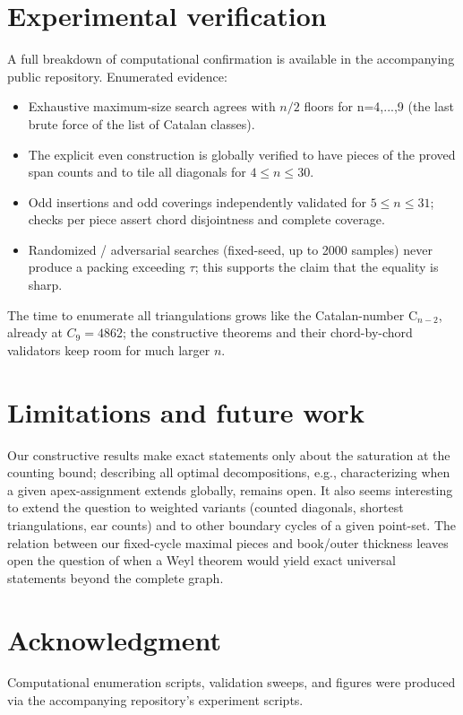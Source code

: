 \documentclass[11pt,a4paper]{article}
\begin{document}
\section{Experimental verification}

A full breakdown of computational confirmation is available in the
accompanying public repository. Enumerated evidence:

\begin{itemize}
\item Exhaustive maximum-size search agrees with $n/2$ floors for
n=4,...,9 (the last brute force of the list of Catalan classes).
\item The explicit even construction is globally verified to have pieces of the
proved span counts and to tile all diagonals for $4 \le n \le 30$.
\item Odd insertions and odd coverings independently validated for
$5 \le n \le 31$; checks per piece assert chord disjointness and complete
coverage.
\item Randomized / adversarial searches (fixed-seed, up to 2000 samples) never
produce a packing exceeding $\tau$; this supports the claim that the
equality is sharp.
\end{itemize}

The time to enumerate all triangulations grows like the Catalan-number
$\mathrm{C}_{n-2}$, already at $C_{9}=4862$; the constructive theorems and
their chord-by-chord validators keep room for much larger $n$.

\section{Limitations and future work}

Our constructive results make exact statements only about the saturation at
the counting bound; describing all optimal decompositions, e.g., characterizing
when a given apex-assignment extends globally, remains open. It also seems
interesting to extend the question to weighted variants (counted diagonals,
shortest triangulations, ear counts) and to other boundary cycles of a given
point-set. The relation between our fixed-cycle maximal pieces and book/outer
thickness leaves open the question of when a Weyl theorem would yield exact
universal statements beyond the complete graph.

\section*{Acknowledgment}

Computational enumeration scripts, validation sweeps, and figures were
produced via the accompanying repository's experiment scripts.



\end{document}
